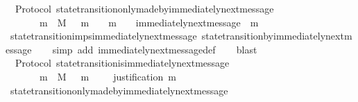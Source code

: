\begin{isabellebody}
{\isafoldproof}%
%
\isadelimproof
\isanewline
%
\endisadelimproof
\isanewline
{}\isamarkupfalse%
\ {\isacharparenleft}\ Protocol{\isacharparenright}\ state{\isacharunderscore}transition{\isacharunderscore}only{\isacharunderscore}made{\isacharunderscore}by{\isacharunderscore}immediately{\isacharunderscore}next{\isacharunderscore}message{\isacharcolon}\ \isanewline
\ \ {\isachardoublequoteopen}{\isasymforall}\ {\isasymsigma}\ {\isasymin}\ {\isasymSigma}{\isachardot}\ {\isasymforall}\ m\ {\isasymin}\ M{\isachardot}\ {\isasymsigma}\ {\isasymunion}\ {\isacharbraceleft}m{\isacharbraceright}\ {\isasymin}\ {\isasymSigma}\ {\isasymand}\ m\ {\isasymnotin}\ {\isasymsigma}\ {\isasymlongleftrightarrow}\ immediately{\isacharunderscore}next{\isacharunderscore}message\ {\isacharparenleft}{\isasymsigma}{\isacharcomma}\ m{\isacharparenright}{\isachardoublequoteclose}\isanewline
%
\isadelimproof
\ \ %
\endisadelimproof
%
\isatagproof
{}\isamarkupfalse%
\ state{\isacharunderscore}transition{\isacharunderscore}imps{\isacharunderscore}immediately{\isacharunderscore}next{\isacharunderscore}message\ state{\isacharunderscore}transition{\isacharunderscore}by{\isacharunderscore}immediately{\isacharunderscore}next{\isacharunderscore}message\isanewline
\ \ \isamarkupfalse%
\ {\isacharparenleft}simp\ add{\isacharcolon}\ immediately{\isacharunderscore}next{\isacharunderscore}message{\isacharunderscore}def{\isacharparenright}\isanewline
\ \ \isamarkupfalse%
\ blast%
\endisatagproof
{\isafoldproof}%
%
\isadelimproof
\isanewline
%
\endisadelimproof
\isanewline
{}\isamarkupfalse%
\ {\isacharparenleft}\ Protocol{\isacharparenright}\ state{\isacharunderscore}transition{\isacharunderscore}is{\isacharunderscore}immediately{\isacharunderscore}next{\isacharunderscore}message{\isacharcolon}\ \isanewline
\ \ {\isachardoublequoteopen}{\isasymforall}\ {\isasymsigma}\ {\isasymin}\ {\isasymSigma}{\isachardot}\ {\isasymforall}\ m\ {\isasymin}\ M{\isachardot}\ {\isasymsigma}\ {\isasymunion}\ {\isacharbraceleft}m{\isacharbraceright}\ {\isasymin}\ {\isasymSigma}\ \ {\isasymlongleftrightarrow}\ justification\ m\ {\isasymsubseteq}\ {\isasymsigma}{\isachardoublequoteclose}\isanewline
%
\isadelimproof
\ \ %
\endisadelimproof
%
\isatagproof
{}\isamarkupfalse%
\ state{\isacharunderscore}transition{\isacharunderscore}only{\isacharunderscore}made{\isacharunderscore}by{\isacharunderscore}immediately{\isacharunderscore}next{\isacharunderscore}message\ \isanewline
\ \ \isamarkupfalse%

\end{isabellebody}
